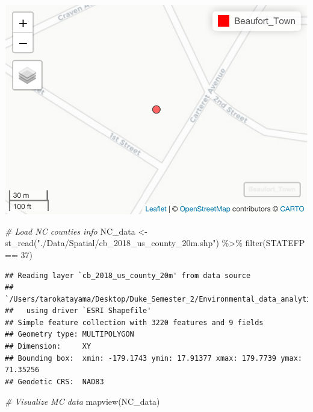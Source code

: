 \documentclass[
  12pt,
]{article}
\newenvironment{Shaded}{\begin{snugshade}}{\end{snugshade}}
\newcommand{\CommentTok}[1]{\textcolor[rgb]{0.56,0.35,0.01}{\textit{#1}}}
\newcommand{\DecValTok}[1]{\textcolor[rgb]{0.00,0.00,0.81}{#1}}
\newcommand{\FunctionTok}[1]{\textcolor[rgb]{0.00,0.00,0.00}{#1}}
\newcommand{\NormalTok}[1]{#1}
\newcommand{\OtherTok}[1]{\textcolor[rgb]{0.56,0.35,0.01}{#1}}
\newcommand{\SpecialCharTok}[1]{\textcolor[rgb]{0.00,0.00,0.00}{#1}}
\newcommand{\StringTok}[1]{\textcolor[rgb]{0.31,0.60,0.02}{#1}}
\begin{document}
\includegraphics{Project_Template_TLK_files/figure-latex/Map of Beaufort-2.pdf}

\begin{Shaded}
\begin{Highlighting}[]
\CommentTok{\# Load NC counties info }
\NormalTok{NC\_data }\OtherTok{\textless{}{-}} \FunctionTok{st\_read}\NormalTok{(}\StringTok{"./Data/Spatial/cb\_2018\_us\_county\_20m.shp"}\NormalTok{) }\SpecialCharTok{\%\textgreater{}\%} 
  \FunctionTok{filter}\NormalTok{(STATEFP }\SpecialCharTok{==} \DecValTok{37}\NormalTok{)}
\end{Highlighting}
\end{Shaded}

\begin{verbatim}
## Reading layer `cb_2018_us_county_20m' from data source 
##   `/Users/tarokatayama/Desktop/Duke_Semester_2/Environmental_data_analytics/R_Projects/KatayamaNgenziThornton_ENV872_EDA_FinalProject/Data/Spatial/cb_2018_us_county_20m.shp' 
##   using driver `ESRI Shapefile'
## Simple feature collection with 3220 features and 9 fields
## Geometry type: MULTIPOLYGON
## Dimension:     XY
## Bounding box:  xmin: -179.1743 ymin: 17.91377 xmax: 179.7739 ymax: 71.35256
## Geodetic CRS:  NAD83
\end{verbatim}

\begin{Shaded}
\begin{Highlighting}[]
\CommentTok{\# Visualize MC data}
\FunctionTok{mapview}\NormalTok{(NC\_data)}
\end{Highlighting}
\end{Shaded}
\end{document}
